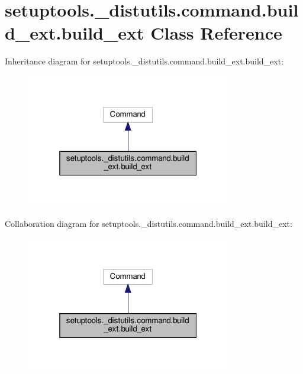 \hypertarget{classsetuptools_1_1__distutils_1_1command_1_1build__ext_1_1build__ext}{}\section{setuptools.\+\_\+distutils.\+command.\+build\+\_\+ext.\+build\+\_\+ext Class Reference}
\label{classsetuptools_1_1__distutils_1_1command_1_1build__ext_1_1build__ext}


Inheritance diagram for setuptools.\+\_\+distutils.\+command.\+build\+\_\+ext.\+build\+\_\+ext\+:
\nopagebreak
\begin{figure}[H]
\begin{center}
\leavevmode
\includegraphics[width=253pt]{classsetuptools_1_1__distutils_1_1command_1_1build__ext_1_1build__ext__inherit__graph}
\end{center}
\end{figure}


Collaboration diagram for setuptools.\+\_\+distutils.\+command.\+build\+\_\+ext.\+build\+\_\+ext\+:
\nopagebreak
\begin{figure}[H]
\begin{center}
\leavevmode
\includegraphics[width=253pt]{classsetuptools_1_1__distutils_1_1command_1_1build__ext_1_1build__ext__coll__graph}
\end{center}
\end{figure}
